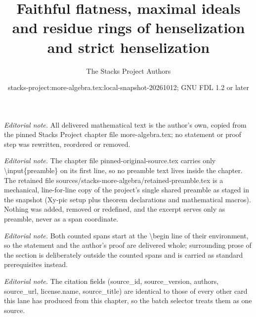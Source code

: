 \documentclass[10pt,a4paper]{amsart}
\title{Faithful flatness, maximal ideals and residue rings of henselization and strict henselization}
\author{The Stacks Project Authors}
\date{stacks-project:more-algebra.tex:local-snapshot-20261012; GNU FDL 1.2 or later}
\theoremstyle{plain}
\theoremstyle{definition}
\theoremstyle{remark}
\numberwithin{equation}{subsection}
\begin{document}
\maketitle
\setcounter{subsection}{1}
\noindent\textit{Editorial note.} All delivered mathematical text is the author's own, copied from the pinned Stacks Project chapter file more-algebra.tex; no statement or proof step was rewritten, reordered or removed.\par\medskip
\noindent\textit{Editorial note.} The chapter file pinned-original-source.tex carries only \textbackslash{}input\{preamble\} on its first line, so no preamble text lives inside the chapter. The retained file sources/stacks-more-algebra/retained-preamble.tex is a mechanical, line-for-line copy of the project's single shared preamble as staged in the snapshot (Xy-pic setup plus theorem declarations and mathematical macros). Nothing was added, removed or redefined, and the excerpt serves only as preamble, never as a span coordinate.\par\medskip
\noindent\textit{Editorial note.} Both counted spans start at the \textbackslash{}begin line of their environment, so the statement and the author's proof are delivered whole; surrounding prose of the section is deliberately outside the counted spans and is carried as standard prerequisites instead.\par\medskip
\noindent\textit{Editorial note.} The citation fields (source\_id, source\_version, authors, source\_url, license.name, source\_title) are identical to those of every other card this lane has produced from this chapter, so the batch selector treats them as one source.\par\medskip
\end{document}
